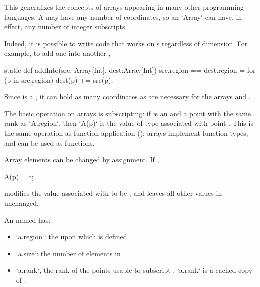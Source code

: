This generalizes the concepts of arrays appearing in many other programming
languages.  A  may have any number of coordinates, so an
\xcd`Array` can have, in effect, any number of integer subscripts.  

\begin{ex}Indeed, it is possible to write code that works on s regardless 
of dimension.  For example, to add one   into another
, 
\begin{xten}
static def addInto(src: Array[Int], dest:Array[Int])
  {src.region == dest.region}
  = {
    for (p in src.region) 
       dest(p) += src(p);
  }
\end{xten}
\noindent
Since  is a , it can hold as many coordinates as are
necessary for the arrays  and .
\end{ex}

The basic operation on arrays is subscripting: if  is an 
and  a point with the same rank as \xcd`A.region`, then
\xcd`A(p)`
is the value of type  associated with point .
This is the same operation as function application
(); arrays implement function types, and can be
used as functions.

Array elements can be changed by assignment. If , 
\begin{xten}
A(p) = t;
\end{xten}
modifies the value associated with  to be , and leaves all other
values in  unchanged.

An  named  has: 
\begin{itemize}
\item \xcd`a.region`: the  upon which  is defined.
\item \xcd`a.size`: the number of elements in .
\item \xcd`a.rank`, the rank of the points usable to subscript . 
      \xcd`a.rank` is a cached copy of 
      .
\end{itemize}

